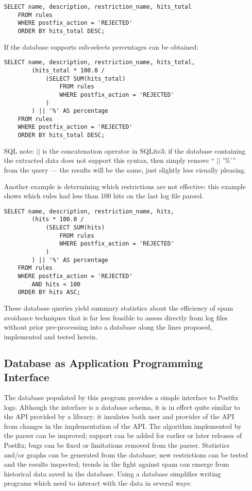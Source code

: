 \documentclass[a4paper,12pt,draft]{article}
\begin{document}
\begin{verbatim}
SELECT name, description, restriction_name, hits_total
    FROM rules
    WHERE postfix_action = 'REJECTED'
    ORDER BY hits_total DESC;
\end{verbatim}

If the database supports sub-selects percentages can be
obtained:

\begin{verbatim}
SELECT name, description, restriction_name, hits_total,
        (hits_total * 100.0 /
            (SELECT SUM(hits_total)
                FROM rules
                WHERE postfix_action = 'REJECTED'
            )
        ) || '%' AS percentage
    FROM rules
    WHERE postfix_action = 'REJECTED'
    ORDER BY hits_total DESC;
\end{verbatim}

SQL note: $||$ is the concatenation operator in SQLite3; if the database
containing the extracted data does not support this syntax, then simply
remove `` $||$ '$\%$'\hspace{1ex}'' from the query --- the results will be
the same, just slightly less visually pleasing.

Another example is determining which restrictions are not effective: this
example shows which rules had less than 100 hits on the last log file
parsed.

\begin{verbatim}
SELECT name, description, restriction_name, hits,
        (hits * 100.0 /
            (SELECT SUM(hits)
                FROM rules
                WHERE postfix_action = 'REJECTED'
            )
        ) || '%' AS percentage
    FROM rules
    WHERE postfix_action = 'REJECTED'
        AND hits < 100
    ORDER BY hits ASC;
\end{verbatim}

These database queries yield summary statistics about the efficiency of
spam avoidance techniques that is far less feasible to assess directly from
log files without prior pre-processing into a database along the lines
proposed, implemented and tested herein.

\subsection{Database as Application Programming Interface}

The database populated by this program provides a simple interface to
Postfix logs.  Although the interface is a database schema, it is in effect
quite similar to the API provided by a library: it insulates both user and
provider of the API from changes in the implementation of the API\@.  The
algorithm implemented by the parser can be improved; support can be added
for earlier or later releases of Postfix; bugs can be fixed or limitations
removed from the parser.  Statistics and/or graphs can be generated from
the database; new restrictions can be tested and the results inspected;
trends in the fight against spam can emerge from historical data saved in
the database.  Using a database simplifies writing programs which need to
interact with the data in several ways:
\end{document}
